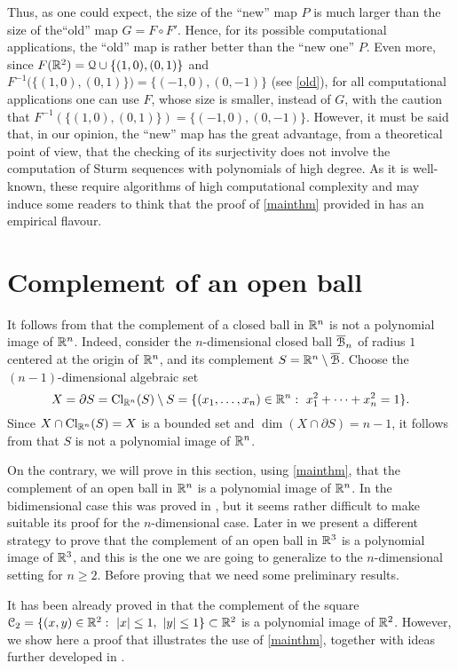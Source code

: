 \documentclass[11pt,a4paper]{amsart}
\theoremstyle{definition}
\theoremstyle{remark}
\newcommand{\Qq}{{\EuScript Q}}
\newcommand{\ball}{{\EuScript B}}
\newcommand{\cube}{{\EuScript C}}
\newcommand{\cl}{\operatorname{Cl}}
\newcommand{\ol}{\overline}
\begin{document}
Thus, as one could expect, the size of the ``new'' map $P$ is much larger than the size of the``old'' map $G=F\circ F'$. Hence, for its possible computational applications, the ``old'' map is rather better than the ``new one'' $P$. Even more, since $F(\R^2)=\Qq\cup\{(1,0),(0,1)\}$ and $F^{-1}\big(\{(1,0),(0,1)\}\big)=\{(-1,0),(0,-1)\}$ (see \ref{old}), for all computational applications one can use $F$, whose size is smaller, instead of $G$, with the caution that $F^{-1}(\{(1,0),(0,1)\})=\{(-1,0),(0,-1)\}$. However, it must be said that, in our opinion, the ``new'' map has the great advantage, from a theoretical point of view, that the checking of its surjectivity does not involve the computation of Sturm sequences with polynomials of high degree. As it is well-known, these require algorithms of high computational complexity and may induce some readers to think that the proof of \ref{mainthm} provided in \cite{fg1} has an empirical flavour. 

\section{Complement of an open ball}\label{s4}

It follows from \cite[3.4]{fg2} that the complement of a closed ball in ${\mathbb R}^n$ is not a polynomial image of ${\mathbb R}^n$. Indeed, consider the $n$-dimensional closed ball $\ol{\ball}_n$ of radius $1$ centered at the origin of ${\mathbb R}^n$, and its complement $S=\R^n\setminus\ol{\ball}$. Choose the $(n-1)$-dimensional algebraic set
$$
X=\partial S=\cl_{\R^n}(S)\setminus S=\{(x_1,\ldots,x_n)\in\R^n:\ x_1^2+\cdots+x_n^2=1\}.
$$
Since $X\cap\cl_{\R^n}(S)=X$ is a bounded set and $\dim(X\cap\partial S)=n-1$, it follows from \cite[3.4]{fg2} that $S$ is not a polynomial image of ${\mathbb R}^n$.

On the contrary, we will prove in this section, using \ref{mainthm}, that the complement of an open ball in ${\mathbb R}^n$ is a polynomial image of ${\mathbb R}^n$. In the bidimensional case this was proved in \cite[4.1]{fg2}, but it seems rather difficult to make suitable its proof for the $n$-dimensional case. Later in \cite [6.1]{fgu1} we present a different strategy to prove that the complement of an open ball in ${\mathbb R}^3$ is a polynomial image of ${\mathbb R}^3$, and this is the one we are going to generalize to the $n$-dimensional setting for $n\geq2$. Before proving that we need some preliminary results.

It has been already proved in \cite[1.1]{u2} that the complement of the square $\cube_2=\{(x,y)\in\R^2:\ |x|\le1,\ |y|\le1\}\subset\R^2$ is a polynomial image of ${\mathbb R}^2$. However, we show here a proof that illustrates the use of \ref{mainthm}, together with ideas further developed in \cite{u2}.
\end{document}
